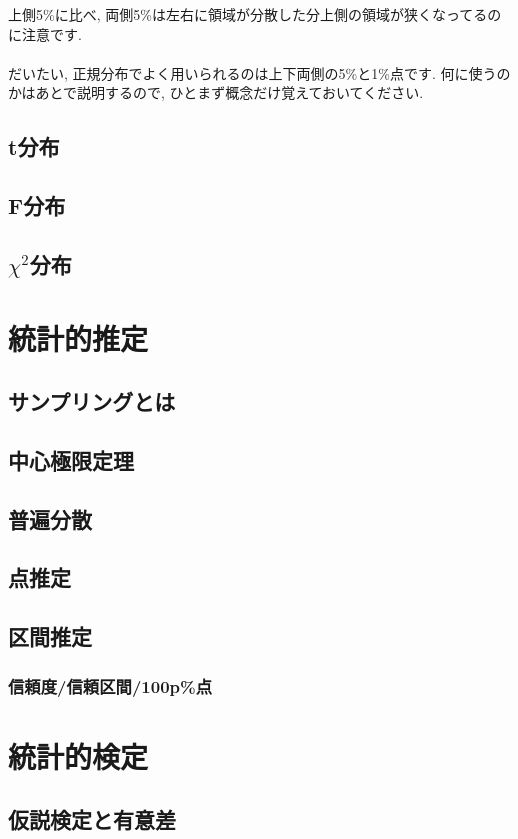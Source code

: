 \documentclass[11pt,a4paper]{jreport}
\begin{document}
上側5\%に比べ, 両側5\%は左右に領域が分散した分上側の領域が狭くなってるのに注意です. \\
\\
だいたい, 正規分布でよく用いられるのは上下両側の5\%と1\%点です. 何に使うのかはあとで説明するので, ひとまず概念だけ覚えておいてください.

\subsection{t分布}
\subsection{F分布}
\subsection{$\chi^2$分布}

\section{統計的推定}

\subsection{サンプリングとは}
\subsection{中心極限定理}
\subsection{普遍分散}
\subsection{点推定}
\subsection{区間推定}
\subsubsection{信頼度/信頼区間/100p\%点}

\section{統計的検定}
\subsection{仮説検定と有意差}
\end{document}
